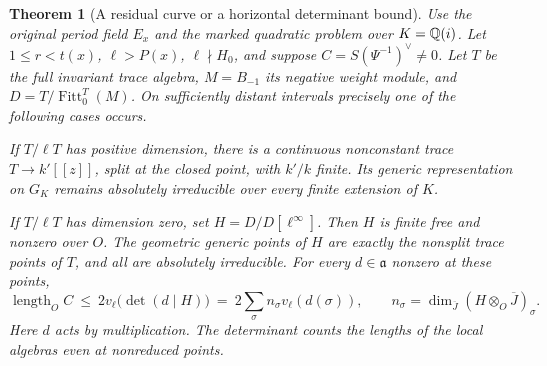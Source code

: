 \documentclass[a4paper,11pt]{article}
\newtheorem{theorem}[proposition]{Theorem}
\theoremstyle{definition}
\theoremstyle{remark}
\numberwithin{equation}{section}
\begin{document}
\begin{theorem}[A residual curve or a horizontal determinant bound]\leavevmode
\label{thm:horizontalstrict399}
Use the original period field \(E_x\) and the marked quadratic
problem over \(K=\mathbb Q(i)\). Let \(1\le r<t(x)\), \(\ell>P(x)\),
\(\ell\nmid H_0\), and suppose \(C=S(\Psi^{-1})^\vee\ne0\).
Let \(T\) be the full invariant trace algebra, \(M=B_{-1}\) its
negative weight module, and \(D=T/\operatorname{Fitt}_0^T(M)\).
On sufficiently distant intervals precisely one of the following
cases occurs.

If \(T/\ell T\) has positive dimension, there is a continuous
nonconstant trace \(T\to k'[[z]]\), split at the closed point,
with \(k'/k\) finite. Its generic representation on \(G_K\)
remains absolutely irreducible over every finite extension of \(K\).

If \(T/\ell T\) has dimension zero, set
\(H=D/D[\ell^\infty]\). Then \(H\) is finite free and nonzero
over \(O\). The geometric generic points of \(H\) are exactly
the nonsplit trace points of \(T\), and all are absolutely
irreducible. For every \(d\in\mathfrak a\) nonzero at these points,
\[
 \operatorname{length}_O C
       \ \le\ 2v_\ell\bigl(\det(d\mid H)\bigr)
       \ =\ 2\sum_{\sigma} n_\sigma v_\ell(d(\sigma)),
 \qquad n_\sigma=\dim_{\overline J}(H\otimes_O\overline J)_\sigma .
\]
Here \(d\) acts by multiplication. The determinant counts the
lengths of the local algebras even at nonreduced points.
\end{theorem}
\end{document}

